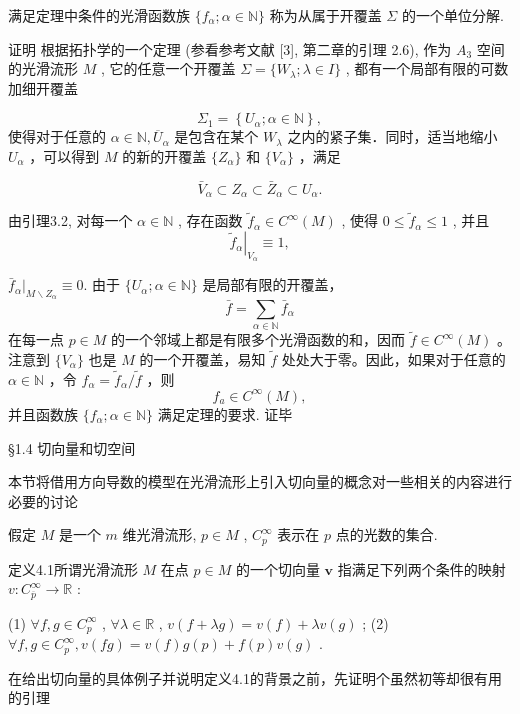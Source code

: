 满足定理中条件的光滑函数族  $\{f_{\alpha}; \alpha \in \mathbb{N}\}$  称为从属于开覆盖  $\Sigma$  的一个单位分解.

证明 根据拓扑学的一个定理 (参看参考文献 [3], 第二章的引理 2.6), 作为  $A_{3}$  空间的光滑流形  $M$ , 它的任意一个开覆盖  $\Sigma = \{W_{\lambda}; \lambda \in I\}$ , 都有一个局部有限的可数加细开覆盖

$$
\Sigma_ {1} = \left\{U _ {\alpha}; \alpha \in \mathbb {N} \right\},
$$
使得对于任意的  $\alpha \in \mathbb{N},\overline{U}_{\alpha}$  是包含在某个  $W_{\lambda}$  之内的紧子集．同时，适当地缩小  $U_{\alpha}$  ，可以得到  $M$  的新的开覆盖  $\{Z_{\alpha}\}$  和  $\{V_{\alpha}\}$  ，满足

$$
\bar {V} _ {\alpha} \subset Z _ {\alpha} \subset \bar {Z} _ {\alpha} \subset U _ {\alpha}.
$$

由引理3.2, 对每一个  $\alpha \in \mathbb{N}$ , 存在函数  $\tilde{f}_{\alpha} \in C^{\infty}(M)$ , 使得  $0 \leqslant \tilde{f}_{\alpha} \leqslant 1$ , 并且
$$
\left. \tilde {f} _ {\alpha} \right| _ {V _ {\alpha}} \equiv 1,
$$

$\bar{f}_{\alpha}\bigg|_{M\backslash Z_{\alpha}}\equiv 0.$  由于  $\{U_{\alpha};\alpha \in \mathbb{N}\}$  是局部有限的开覆盖，
$$
\bar {f} = \sum_ {\alpha \in \mathbb {N}} \bar {f} _ {\alpha}
$$
在每一点  $p \in M$  的一个邻域上都是有限多个光滑函数的和，因而  $\tilde{f} \in C^{\infty}(M)$ 。注意到  $\{V_{\alpha}\}$  也是  $M$  的一个开覆盖，易知  $\tilde{f}$  处处大于零。因此，如果对于任意的  $\alpha \in \mathbb{N}$ ，令  $f_{\alpha} = \tilde{f}_{\alpha} / \tilde{f}$ ，则
$$
f _ {a} \in C ^ {\infty} (M),
$$
并且函数族  $\{f_{\alpha}; \alpha \in \mathbb{N}\}$  满足定理的要求. 证毕

 §1.4 切向量和切空间

本节将借用方向导数的模型在光滑流形上引入切向量的概念对一些相关的内容进行必要的讨论

假定  $M$  是一个  $m$  维光滑流形,  $p \in M$ ,  $C_{p}^{\infty}$  表示在  $p$  点的光数的集合.

定义4.1所谓光滑流形  $M$  在点  $p \in M$  的一个切向量  $\pmb{v}$  指满足下列两个条件的映射  $v: C_{\overline{p}}^{\infty} \to \mathbb{R}$ :

(1)  $\forall f, g \in C_p^\infty$ ,  $\forall \lambda \in \mathbb{R}$ ,  $v(f + \lambda g) = v(f) + \lambda v(g)$ ;  
(2)  $\forall f, g \in C_{p}^{\infty}, v(fg) = v(f)g(p) + f(p)v(g)$ .

在给出切向量的具体例子并说明定义4.1的背景之前，先证明个虽然初等却很有用的引理

